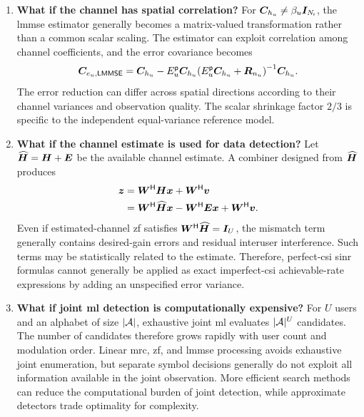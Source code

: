 \begin{enumerate}[label=\textbf{\arabic*.}]
	\item \textbf{What if the channel has spatial correlation?}
	For $\bm{C}_{h_u}\ne\beta_u\bm{I}_{N_{\mathsf{r}}}$, the \ac{lmmse} estimator generally becomes a matrix-valued transformation rather than a common scalar scaling. The estimator can exploit correlation among channel coefficients, and the error covariance becomes
	\begin{equation*}
		\bm{C}_{e_u,\mathsf{LMMSE}}
		=\bm{C}_{h_u}
		-E_u^{\mathsf p}\bm{C}_{h_u}
		{(E_u^{\mathsf p}\bm{C}_{h_u}+\bm{R}_{n_u})}^{-1}
		\bm{C}_{h_u}.
	\end{equation*}
	The error reduction can differ across spatial directions according to their channel variances and observation quality. The scalar shrinkage factor $2/3$ is specific to the independent equal-variance reference model.
	
	\item \textbf{What if the channel estimate is used for data detection?}
	Let $\widehat{\bm{H}}=\bm{H}+\bm{E}$ be the available channel estimate. A combiner designed from $\widehat{\bm{H}}$ produces
	\begin{equation*}
		\begin{split}
			\bm{z}
			&={\bm{W}}^{\mathsf{H}}\bm{H}\bm{x}+{\bm{W}}^{\mathsf{H}}\bm{v}\\
			&={\bm{W}}^{\mathsf{H}}\widehat{\bm{H}}\bm{x}
			-{\bm{W}}^{\mathsf{H}}\bm{E}\bm{x}
			+{\bm{W}}^{\mathsf{H}}\bm{v}.
		\end{split}
	\end{equation*}
	Even if estimated-channel \ac{zf} satisfies ${\bm{W}}^{\mathsf{H}}\widehat{\bm{H}}=\bm{I}_U$, the mismatch term generally contains desired-gain errors and residual interuser interference. Such terms may be statistically related to the estimate. Therefore, perfect-\ac{csi} \ac{sinr} formulas cannot generally be applied as exact imperfect-\ac{csi} achievable-rate expressions by adding an unspecified error variance.
	
	\item \textbf{What if joint \ac{ml} detection is computationally expensive?}
	For $U$ users and an alphabet of size $|\mathcal{A}|$, exhaustive joint \ac{ml} evaluates $|\mathcal{A}|^U$ candidates. The number of candidates therefore grows rapidly with user count and modulation order. Linear \ac{mrc}, \ac{zf}, and \ac{lmmse} processing avoids exhaustive joint enumeration, but separate symbol decisions generally do not exploit all information available in the joint observation. More efficient search methods can reduce the computational burden of joint detection, while approximate detectors trade optimality for complexity.
	

\end{enumerate}
